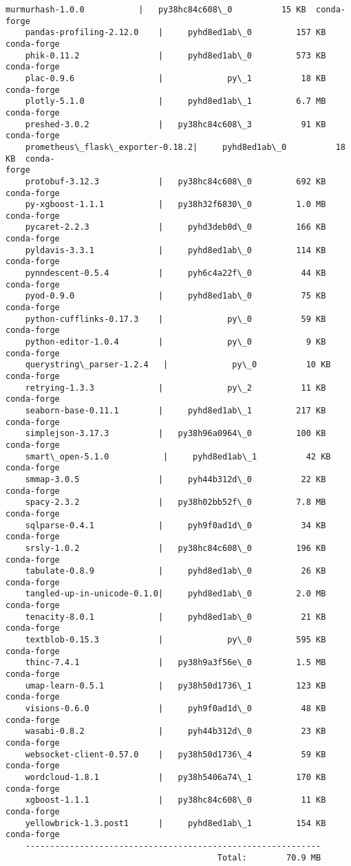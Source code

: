 \documentclass[11pt]{article}
\begin{document}
\begin{Verbatim}[commandchars=\\\{\}]
    murmurhash-1.0.0           |   py38hc84c608\_0          15 KB  conda-forge
    pandas-profiling-2.12.0    |     pyhd8ed1ab\_0         157 KB  conda-forge
    phik-0.11.2                |     pyhd8ed1ab\_0         573 KB  conda-forge
    plac-0.9.6                 |             py\_1          18 KB  conda-forge
    plotly-5.1.0               |     pyhd8ed1ab\_1         6.7 MB  conda-forge
    preshed-3.0.2              |   py38hc84c608\_3          91 KB  conda-forge
    prometheus\_flask\_exporter-0.18.2|     pyhd8ed1ab\_0          18 KB  conda-
forge
    protobuf-3.12.3            |   py38hc84c608\_0         692 KB  conda-forge
    py-xgboost-1.1.1           |   py38h32f6830\_0         1.0 MB  conda-forge
    pycaret-2.2.3              |     pyhd3deb0d\_0         166 KB  conda-forge
    pyldavis-3.3.1             |     pyhd8ed1ab\_0         114 KB  conda-forge
    pynndescent-0.5.4          |     pyh6c4a22f\_0          44 KB  conda-forge
    pyod-0.9.0                 |     pyhd8ed1ab\_0          75 KB  conda-forge
    python-cufflinks-0.17.3    |             py\_0          59 KB  conda-forge
    python-editor-1.0.4        |             py\_0           9 KB  conda-forge
    querystring\_parser-1.2.4   |             py\_0          10 KB  conda-forge
    retrying-1.3.3             |             py\_2          11 KB  conda-forge
    seaborn-base-0.11.1        |     pyhd8ed1ab\_1         217 KB  conda-forge
    simplejson-3.17.3          |   py38h96a0964\_0         100 KB  conda-forge
    smart\_open-5.1.0           |     pyhd8ed1ab\_1          42 KB  conda-forge
    smmap-3.0.5                |     pyh44b312d\_0          22 KB  conda-forge
    spacy-2.3.2                |   py38h02bb52f\_0         7.8 MB  conda-forge
    sqlparse-0.4.1             |     pyh9f0ad1d\_0          34 KB  conda-forge
    srsly-1.0.2                |   py38hc84c608\_0         196 KB  conda-forge
    tabulate-0.8.9             |     pyhd8ed1ab\_0          26 KB  conda-forge
    tangled-up-in-unicode-0.1.0|     pyhd8ed1ab\_0         2.0 MB  conda-forge
    tenacity-8.0.1             |     pyhd8ed1ab\_0          21 KB  conda-forge
    textblob-0.15.3            |             py\_0         595 KB  conda-forge
    thinc-7.4.1                |   py38h9a3f56e\_0         1.5 MB  conda-forge
    umap-learn-0.5.1           |   py38h50d1736\_1         123 KB  conda-forge
    visions-0.6.0              |     pyh9f0ad1d\_0          48 KB  conda-forge
    wasabi-0.8.2               |     pyh44b312d\_0          23 KB  conda-forge
    websocket-client-0.57.0    |   py38h50d1736\_4          59 KB  conda-forge
    wordcloud-1.8.1            |   py38h5406a74\_1         170 KB  conda-forge
    xgboost-1.1.1              |   py38hc84c608\_0          11 KB  conda-forge
    yellowbrick-1.3.post1      |     pyhd8ed1ab\_1         154 KB  conda-forge
    ------------------------------------------------------------
                                           Total:        70.9 MB


\end{Verbatim}
\end{document}
